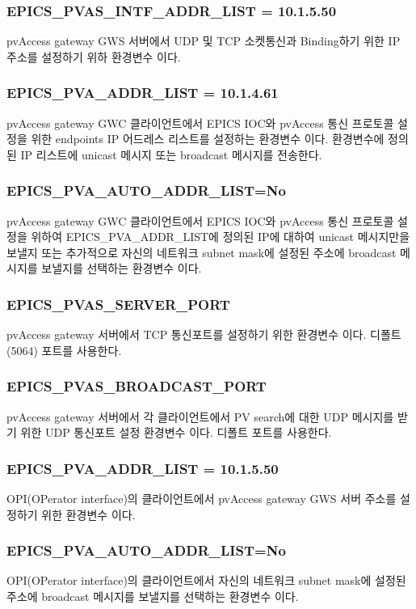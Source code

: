 \documentclass[11pt
  , a4paper
  , article
  , oneside
]{memoir}
\begin{document}
\subsubsection {EPICS\_PVAS\_INTF\_ADDR\_LIST = 10.1.5.50}
pvAccess gateway GWS 서버에서 UDP 및 TCP 소켓통신과 Binding하기 위한 IP 주소를 설정하기 위하 환경변수 이다.

\subsubsection {EPICS\_PVA\_ADDR\_LIST = 10.1.4.61}
pvAccess gateway GWC 클라이언트에서 EPICS IOC와 pvAccess 통신 프로토콜 설정을 위한 endpoints IP 어드레스 리스트를 설정하는 환경변수 이다. 환경변수에 정의된 IP 리스트에 unicast 메시지 또는 broadcast 메시지를 전송한다.

\subsubsection {EPICS\_PVA\_AUTO\_ADDR\_LIST=No}
pvAccess gateway GWC 클라이언트에서 EPICS IOC와 pvAccess 통신 프로토콜 설정을 위하여 EPICS\_PVA\_ADDR\_LIST에 정의된 IP에 대하여 unicast 메시지만을 보낼지 또는 추가적으로 자신의 네트워크 subnet mask에 설정된 주소에 broadcast 메시지를 보낼지를 선택하는 환경변수 이다.


\subsubsection {EPICS\_PVAS\_SERVER\_PORT}
pvAccess gateway 서버에서 TCP 통신포트를 설정하기 위한 환경변수 이다. 디폴트(5064) 포트를 사용한다.

\subsubsection {EPICS\_PVAS\_BROADCAST\_PORT}
pvAccess gateway 서버에서 각 클라이언트에서 PV search에 대한 UDP 메시지를 받기 위한 UDP 통신포트 설정 환경변수 이다. 디폴트 포트를 사용한다.

\subsubsection {EPICS\_PVA\_ADDR\_LIST = 10.1.5.50}
OPI(OPerator interface)의 클라이언트에서 pvAccess gateway GWS 서버 주소를 설정하기 위한 환경변수 이다.

\subsubsection {EPICS\_PVA\_AUTO\_ADDR\_LIST=No}
OPI(OPerator interface)의 클라이언트에서 자신의 네트워크 subnet mask에 설정된 주소에 broadcast 메시지를 보낼지를 선택하는 환경변수 이다.
\end{document}
